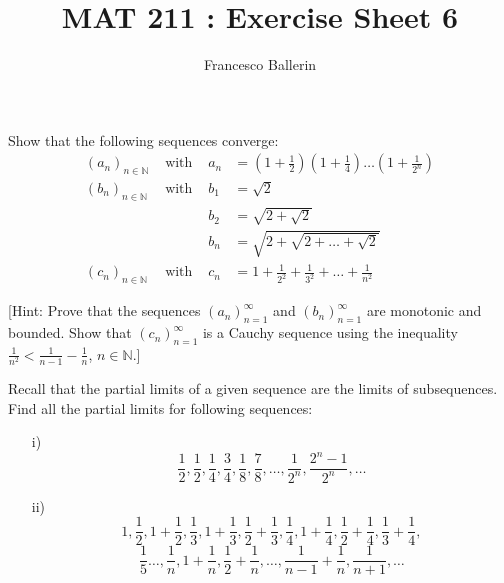 \documentclass[11pt]{article}%
\title{MAT 211 : Exercise Sheet 6}
\author{Francesco Ballerin}
\date{\color{gray}{\small{francesco.ballerin@uib.no}}}
\begin{document}
\begin{minipage}[t]{\dimexpr \textwidth-6cm-\columnsep}
     \maketitle
\end{minipage}
\hfill\noindent{}

\vspace{50pt}

\begin{Exercise}[title=**$\dagger$]
Show that the following sequences converge:
$$\begin{aligned}
	(a_n)_{n\in\mathbb{N}} &\text{ with } &a_n&=(1+\frac{1}{2})(1+\frac{1}{4})\ldots(1+\frac{1}{2^n})\\
	(b_n)_{n\in\mathbb{N}} &\text{ with } &b_1&= \sqrt 2 \\
	& &b_2  &=\sqrt{2+\sqrt 2}\\
	& &b_n &=\sqrt{2+\sqrt{2+\ldots+\sqrt 2}}\\
	(c_n)_{n\in\mathbb{N}} &\text{ with } &c_n &= 1+\frac{1}{2^2}+\frac{1}{3^2}+\ldots+\frac{1}{n^2}
\end{aligned}
$$

[Hint: Prove that the sequences $(a_n)_{n=1}^{\infty}$ and $(b_n)_{n=1}^{\infty}$ are monotonic and bounded. Show that $(c_n)_{n=1}^{\infty}$ is a Cauchy sequence using the inequality $\frac{1}{n^2}<\frac{1}{n-1}-\frac{1}{n}$, $n\in\mathbb N$.]
\end{Exercise}

\begin{Exercise}[title=*$\dagger$]
Recall that the partial limits of a given sequence are the limits of subsequences. Find all the partial limits for following sequences:
\begin{itemize}
	\item[i)]{$$\frac{1}{2},\frac{1}{2},\frac{1}{4},\frac{3}{4},\frac{1}{8},\frac{7}{8},\ldots,\frac{1}{2^n},\frac{2^n-1}{2^n},\ldots$$}
	\item[ii)]{$$1,\frac{1}{2},1+\frac{1}{2},\frac{1}{3},1+\frac{1}{3},\frac{1}{2}+\frac{1}{3},\frac{1}{4},1+\frac{1}{4},\frac{1}{2}+\frac{1}{4},\frac{1}{3}+\frac{1}{4},$$ $$\frac{1}{5}\ldots,\frac{1}{n},1+\frac{1}{n},\frac{1}{2}+\frac{1}{n},\ldots,\frac{1}{n-1}+\frac{1}{n},\frac{1}{n+1},\ldots$$}
\end{itemize}
\end{Exercise}
\end{document}
